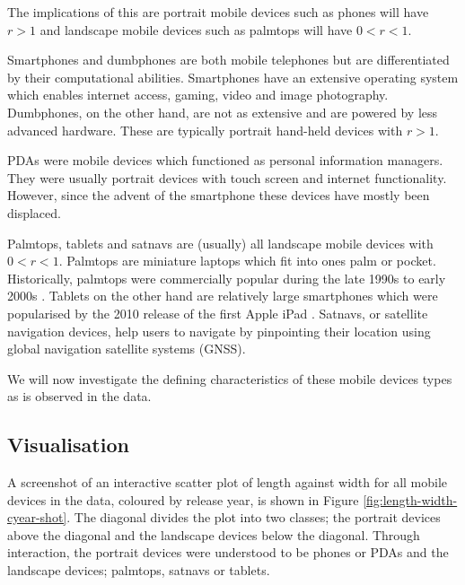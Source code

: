\documentclass[conference]{IEEEtran}
\begin{document}
The implications of this are portrait mobile devices such as phones will
have $r>1$ and landscape mobile devices such as palmtops will have $0<r<1$.

Smartphones and dumbphones are both mobile telephones but are differentiated by
their computational abilities. Smartphones have an extensive operating system
which enables internet access, gaming, video and image photography. Dumbphones,
on the other hand, are not as extensive and are powered by less advanced
hardware. These are typically portrait hand-held devices with $r>1$.

PDAs were mobile devices which functioned as personal information managers. They
were usually portrait devices with touch screen and internet functionality.
However, since the advent of the smartphone these devices have mostly been
displaced.

Palmtops, tablets and satnavs are (usually) all landscape mobile devices with $0<r<1$.
Palmtops are miniature laptops which fit into ones palm or pocket. Historically,
palmtops were commercially popular during the late 1990s to early 2000s
\cite{palm}.
Tablets on the other hand are relatively large smartphones which were
popularised by the 2010 release of the first Apple iPad \cite{ipad}.
Satnavs, or satellite navigation devices, help users to navigate by pinpointing
their location using global navigation satellite systems (GNSS).

We will now investigate the defining characteristics of these mobile
devices types as is observed in the data.

\subsection{Visualisation} \label{sec:Avisu}

A screenshot of an interactive scatter plot of length against width for all
mobile devices in the data, coloured by release year, is shown in Figure
\ref{fig:length-width-cyear-shot}. The diagonal divides the plot into two
classes; the portrait devices above the diagonal and the landscape devices
below the diagonal.
Through interaction, the portrait devices were understood
to be phones or PDAs and the landscape devices; palmtops, satnavs or tablets.
\end{document}
